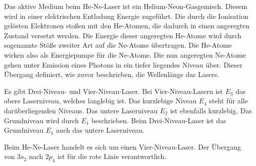 

Das aktive Medium beim He-Ne-Laser ist ein Helium-Neon-Gasgemisch. Diesem wird in einer elektrischen Entladung Energie zugeführt. Die durch die Ionisation gelösten Elektronen stoßen mit den He-Atomen, die dadurch in einen angeregten Zustand versetzt werden. Die Energie dieser angeregten He-Atome wird durch sogenannte Stöße zweiter Art auf die Ne-Atome übertragen. Die He-Atome wirken also als Energiepumpe für die Ne-Atome. Die nun angeregten Ne-Atome gehen unter Emission eines Photons in ein tiefer liegendes Niveau über. Dieser Übergang definiert, wie zuvor beschrieben, die Wellenlänge das Lasers. \cite{Laser}



Es gibt Drei-Niveau- und Vier-Niveau-Laser.
Bei Vier-Niveau-Lasern ist $E_3$ das obere Laserniveau, welches langlebig ist. Das kurzlebige Niveau $E_4$ steht für alle darüberliegenden Niveaus. Das untere Laserniveau $E_2$ ist ebenfalls kurzlebig. Das Grundniveau wird durch $E_1$ beschrieben.
Beim Drei-Niveau-Laser ist das Grundniveau $E_1$ auch das untere Laserniveau. \cite{Photonik}


Beim He-Ne-Laser handelt es sich um einen Vier-Niveau-Laser.
Der Übergang von $3s_2$ nach $2p_4$ ist für die rote Linie verantwortlich. \cite{Laser}



